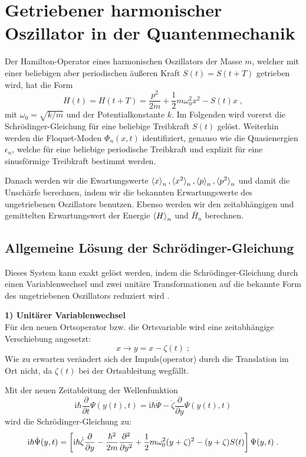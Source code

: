 \chapter{Getriebener harmonischer Oszillator in der Quantenmechanik}
  Der Hamilton-Operator eines harmonischen Oszillators der Masse $m$, welcher mit einer beliebigen aber periodischen äußeren Kraft $S(t)=S(t+T)$ getrieben wird, hat die Form
  \begin{equation}
    H(t) = H(t+T) = \frac{p^2}{2m} + \frac{1}{2}m\omega_0^2x^2-S(t)x \; ,
  \end{equation}
  mit $\omega_0=\sqrt{k/m}$ und der Potentialkonstante $k$.
  Im Folgenden wird vorerst die Schrödinger-Gleichung für eine beliebige Treibkraft $S(t)$ gelöst.
  Weiterhin werden die Floquet-Moden $\Phi_n(x,t)$ identifiziert, genauso wie die Quasienergien $\epsilon_n$, welche für eine beliebige periodische Treibkraft und explizit für eine sinusförmige Treibkraft bestimmt werden.

  Danach werden wir die Ewartungswerte $\braket{x}_n,\braket{x^2}_n,\braket{p}_n,\braket{p^2}_n$ und damit die Unschärfe berechnen, indem wir die bekannten Erwartungswerte des ungetriebenen Oszillators benutzen.
  Ebenso werden wir den zeitabhängigen und gemittelten Erwartungswert der Energie $\braket{H}_n$ und $\bar H_n$ berechnen.



\section{Allgemeine Lösung der Schrödinger-Gleichung}
  \label{lsg_einzelner}
  Dieses System kann exakt gelöst werden, indem die Schrödinger-Gleichung durch einen Variablenwechsel und zwei unitäre Transformationen auf die bekannte Form des ungetriebenen Oszillators reduziert wird \cite{haengi}.

  \textbf{1) Unitärer Variablenwechsel}\\
  Für den neuen Ortsoperator bzw. die Ortsvariable wird eine zeitabhängige Verschiebung angesetzt:
  \begin{equation}
    x \rightarrow y=x-\zeta(t) \; ;
  \end{equation}
  Wie zu erwarten verändert sich der Impuls(operator) durch die Translation im Ort nicht, da $\zeta(t)$ bei der Ortsableitung wegfällt.

  Mit der neuen Zeitableitung der Wellenfunktion
  \begin{equation}
    \text{i}\hbar \frac{\partial}{\partial t} \Psi(y(t),t) = \text{i}\hbar \dot{\Psi} -\dot{\zeta}\frac{\partial}{\partial y}\Psi(y(t),t)
  \end{equation}
  wird die Schrödinger-Gleichung zu:
  \begin{equation}
    \text i \hbar \dot{\Psi}(y,t) = \left[\text i \hbar \dot{\zeta}\frac{\partial}{\partial y}-\frac{\hbar^2}{2m}\frac{\partial^2}{\partial y^2}+\frac{1}{2}m\omega_0^2(y+\zeta)^2-(y+\zeta)S(t)\right]\Psi(y,t) \; .
    \label{schroedinger_einzeln_getrieben}
  \end{equation}

